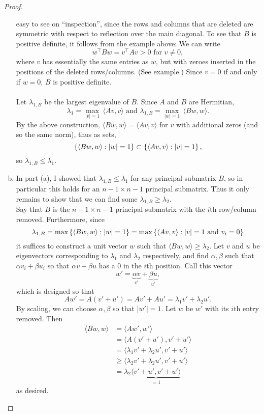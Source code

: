 \documentclass{article}
\begin{document}
\begin{proof}
\begin{enumerate}[(a)]
    easy to see on ``inspection'', since the rows and columns that are deleted
    are symmetric with respect to reflection over the main diagonal.
    To see that $B$ is positive definite, it follows from the example above:
    We can write \[
      w^\top B w = v^\top A v > 0 \text{ for } v \neq 0,
    \] where $v$ has essentially the same entries as $w$, but with zeroes
    inserted in the positions of the deleted rows/columns. (See example.)
    Since $v = 0$ if and only if $w = 0$, $B$ is positive definite.
    \\~\\
    Let $\lambda_{1,B}$ be the largest eigenvalue of $B$.
    Since $A$ and $B$ are Hermitian, \[
      \lambda_1 = \max_{|v| = 1}\,\langle Av, v\rangle \text { and }
      \lambda_{1,B} = \max_{|w| = 1}\,\langle Bw, w\rangle.
    \] By the above construction, $\langle Bw, w\rangle = \langle Av, v\rangle$
    for $v$ with additional zeros (and so the same norm), thus as sets, \[
      \left\{ \langle Bw, w\rangle : |w| = 1 \right\} \subset
      \left\{ \langle Av, v\rangle : |v| = 1 \right\},
    \] so $\lambda_{1,B} \leq \lambda_1$.
    \item In part (a), I showed that $\lambda_{1,B} \leq \lambda_1$ for any
    principal submatrix $B$, so in particular this holds for an
    $n - 1 \times n - 1$ principal submatrix. Thus it only remains to show that
    we can find some $\lambda_{1,B} \geq \lambda_2$.
    \\
    Say that $B$ is the $n - 1 \times n - 1$ principal submatrix with the $i$th
    row/column removed. Furthermore, since \[
      \lambda_{1,B}
      = \max\left\{ \langle Bw, w\rangle : |w| = 1 \right\}
      = \max\left\{ \langle Av, v\rangle : |v| = 1 \text{ and } v_i = 0 \right\}
    \] it suffices to construct a unit vector $w$ such that
    $\langle Bw, w\rangle \geq \lambda_2$.
    Let $v$ and $u$ be eigenvectors corresponding to $\lambda_1$ and
    $\lambda_2$ respectively, and find $\alpha, \beta$ such that $\alpha v_i + \beta u_i$ so that $\alpha v + \beta u$ has a $0$ in the $i$th position.
    Call this vector \[
      w' = \underbrace{\alpha v}_{v'} + \underbrace{\beta u}_{u'},
    \] which is designed so that \[
      Aw' = A(v' + u') = Av' + Au' = \lambda_1v' + \lambda_2u'.
    \] By scaling, we can choose $\alpha, \beta$ so that
    $|w'| = 1$.
    Let $w$ be $w'$ with its $i$th entry removed. Then \begin{align*}
      \langle Bw, w\rangle
      &= \langle Aw', w'\rangle \\
      &= \langle A(v' + u'), v' + u'\rangle \\
      &= \langle \lambda_1v' + \lambda_2u', v' + u' \rangle \\
      &\geq \langle \lambda_2v' + \lambda_2u', v' + u' \rangle \\
      &= \lambda_2 \underbrace{\langle v' + u', v' + u' \rangle}_{=1}
    \end{align*} as desired.
  \end{enumerate}
\end{proof}
\end{document}
